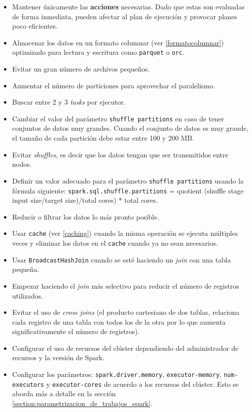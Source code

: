 \begin{itemize}
	\item Mantener únicamente las \textbf{acciones} necesarias. Dado que estas son evaluadas de forma inmediata, pueden afectar al plan de ejecución y provocar planes poco eficientes.
	\item Almacenar los datos en un formato columnar (ver \ref{formatocolumnar}) optimizado para lectura y escritura como \texttt{parquet} o \texttt{orc}.
	\item Evitar un gran número de archivos pequeños.
	\item Aumentar el número de particiones para aprovechar el paralelismo.
	\item Buscar entre 2 y 3 \textit{tasks} por ejecutor.
	\item Cambiar el valor del parámetro \texttt{shuffle partitions} en caso de tener conjuntos de datos muy grandes. Cuando el conjunto de datos es muy grande, el tamaño de cada partición debe estar entre 100 y 200 MB. 
	\item Evitar \textit{shuffles}, es decir que los datos tengan que ser transmitidos entre nodos.
	\item Definir un valor adecuado para el parámetro \texttt{shuffle partitions} usando la fórmula siguiente: \texttt{spark.sql.shuffle.partitions} = quotient (shuffle stage input size/target size)/total cores) * total cores.
	\item Reducir o filtrar los datos lo más pronto posible.
	\item Usar \texttt{cache} (ver \ref{caching}) cuando la misma operación se ejecuta múltiples veces y eliminar los datos en el \texttt{cache} cuando ya no sean necesarios.
	\item Usar \texttt{BroadcastHashJoin} cuando se esté haciendo un \textit{join} con una tabla pequeña.
	\item Empezar haciendo el \textit{join} más selectivo para reducir el número de registros utilizados.
	\item Evitar el uso de \textit{cross joins} (el producto cartesiano de dos tablas, relaciona cada registro de una tabla con todos los de la otra por lo que aumenta significativamente el número de registros).
	\item Configurar el uso de recursos del clúster dependiendo del administrador de recursos y la versión de Spark.
	\item Configurar los parámetros: \texttt{spark.driver.memory}, \texttt{executor-memory}, \texttt{num-executors} y \texttt{executor-cores} de acuerdo a los recursos del clúster. Esto se aborda más a detalle en la sección \ref{section:parametrizacion_de_trabajos_spark}.

\end{itemize}
